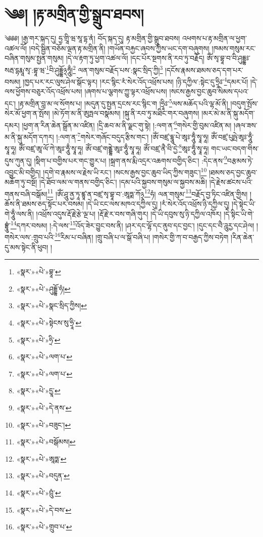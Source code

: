 \chapter{༄༅། །རྟ་མགྲིན་གྱི་སྒྲུབ་ཐབས།}༄༅༅། །རྒྱ་གར་སྐད་དུ། ཧྱ་གྲཱི་ཝ་སཱ་དྷ་ནཾ། བོད་སྐད་དུ། རྟ་མགྲིན་གྱི་སྒྲུབ་ཐབས། འཕགས་པ་རྟ་མགྲིན་ལ་ཕྱག་འཚལ་ལོ། །བདེ་སྦྱིན་བཅོམ་ལྡན་རྟ་མགྲིན་ནི། །གཡོན་བརྐྱང་ཞབས་ཀྱིས་ཡང་དག་བཞུགས། །ཁམས་གསུམ་རང་བཞིན་གསུམ་སྤྱན་གསུམ། །དེ་ལ་རྟག་ཏུ་ཕྱག་འཚལ་ལོ། །དང་པོར་སྔགས་ནི་རབ་ཏུ་བརྗོད། ཨོཾ་སྭ་བྷཱ་བ་བི་ཤུདྡྷཿ་སརྦ་དྷརྨཱ་སྭ་:བྷཱ་ཝ་\footnote{«སྣར་»«པེ་»བྷཱ་}བི་ཤུདྡྷོ྅ཧཱུྃ།\footnote{«སྣར་»«པེ་»ཤུདྡྷོ་ཧཾ།} ལན་གསུམ་བརྗོད་པས་:སྣང་སྲིད་ཀྱི།\footnote{«སྣར་»«པེ་»སྣང་སྲིད་ཀྱིས།} །དངོས་རྣམས་ཐམས་ཅད་དག་པར་བསམ། །ཁྱད་པར་རང་ལུས་ཤེལ་སྒོང་ལྟར། །རང་སྙིང་རཾ་སེར་འོད་འཕྲོས་པས། །ཉི་དཀྱིལ་:སྟེང་དུ་ཧྲཱིཿ་\footnote{«སྣར་»«པེ་»སྟེངས་སུ་ཧྲཱི་}དམར་པོ། །དེ་ལས་ཕྱོགས་བཅུར་འོད་འཕྲོས་པས། །ཞགས་པ་ལྕགས་ཀྱུ་ལྟར་འཕྲོས་པས། །སངས་རྒྱས་བྱང་ཆུབ་སེམས་དཔའ་དང་། །རྟ་མགྲིན་བླ་མ་ལ་སོགས་པ། །མདུན་དུ་སྤྱན་དྲངས་རང་སྙིང་ག །ཧྲཱིཿ་\footnote{«སྣར་»«པེ་»ཧྲི་}ལས་མཆོད་པའི་ལྷ་མོ་ནི། །བདུག་སྤོས་སེར་མོ་ཕྱག་ན་སྤོས། །མེ་ཏོག་མ་ནི་ཨུཏྤལ་བསྣམས། །སྐུ་ནི་རབ་ཏུ་མཐིང་གར་བཞུགས། །མར་མེ་མ་ནི་སྐུ་མདོག་དམར། །ཕྱག་ན་རིན་ཆེན་སྒྲོན་མ་འཛིན། །དྲི་ཆབ་མ་ནི་ལྗང་གུ་སྟེ། །:ལག་ན་\footnote{«སྣར་»«པེ་»ལག་པ་}གསེར་གྱི་བུམ་འཛིན་མ། །ཞལ་ཟས་མ་ནི་སྐུ་མདོག་དཀར། །:ལག་ན་\footnote{«སྣར་»«པེ་»ལག་པ་}གསེར་གཞོང་བདུད་རྩིས་གང་། །ཨོཾ་བཛྲ་དྷཱུ་པེ་ཨཱཿ་ཧཱུྃ་སྭཱ་ཧཱ། ཨོཾ་བཛྲ་པུཥྤེ་ཨཱཿ་ཧཱུྃ་སྭཱ་ཧཱ། ཨོཾ་བཛྲ་ཨཱ་ལོ་ཀེ་ཨཱཿ་ཧཱུྃ་སྭཱ་ཧཱ། ཨོཾ་བཛྲ་གནྡྷེ་ཨཱཿ་ཧཱུྃ་སྭཱ་ཧཱ། ཨོཾ་བཛྲ་ནཻ་བི་དྱེ་\footnote{«སྣར་»«པེ་»དྱཱ་}ཨཱཿ་ཧཱུྃ་སྭཱ་ཧཱ། གང་ཡང་བདག་གིས་དུས་ཀུན་དུ། །སྡིག་པ་བགྱིས་པར་གང་གྱུར་པ། །སྐྲག་ནས་རྨི་འདྲར་འཆགས་བགྱིད་ཅིང་། :དེང་ནས་\footnote{«སྣར་»«པེ་»དེ་ནས་}བརྩམས་ཏེ་འབྱུང་མི་བགྱིད། །དགེ་བ་རྣམས་ལ་རྗེས་ཡི་རང་། །སངས་རྒྱས་བྱང་ཆུབ་ཡིད་ཀྱིས་གཟུང་།\footnote{«སྣར་»«པེ་»བཟུང་།} །ཐམས་ཅད་བྱང་ཆུབ་མཆོག་ཏུ་བསྔོ། །དེ་ཐོབ་ལམ་ལ་གནས་བགྱིད་ཅིང་། །དམ་པའི་སྐྱབས་གསུམ་ལ་སྐྱབས་མཆི། །དེ་རྗེས་ཚངས་པའི་གནས་བཞི་བསྒོམ།\footnote{«སྣར་»«པེ་»བསྒོམས།} །ཨོཾ་ཤཱུ་ནྱ་ཏཱ་ཛྙཱ་ན་བཛྲ་སྭ་བྷཱ་བ་:ཨཱཏྨ་ཀོ྅\footnote{«སྣར་»«པེ་»ཨཱཏྨ་}ཧཾ། ལན་གསུམ་\footnote{«སྣར་»«པེ་»བདུན་}བརྗོད་བྱ་ཏིང་འཛིན་གྱིས། །ཆོས་ནི་ཐམས་ཅད་སྟོང་པར་བསམ། །དེ་ཡི་ངང་ལས་མཁའ་དཀྱིལ་དུ། །རཾ་སེར་འོད་འཕྲོས་ཉི་དཀྱིལ་དུ། །དེ་སྟེང་ཡི་གེ་ཧཱུྃ་ལས་ནི། །འཕྲོས་འདུས་རྡོ་རྗེ་རྩེ་ལྔ་པ། །རྡོ་རྗེ་ར་བས་གཞི་གུར། །དེ་ཡི་དབུས་སུ་ཉི་དཀྱིལ་འཁོར། །དེ་སྟིང་ཡི་གེ་བྷྲཱུཾ་\footnote{«སྣར་»«པེ་»བྲུཾ་}དཀར་བསམ། །:དེ་ལས་\footnote{«སྣར་»«པེ་»དེ་བས་}འོད་ཟེར་བྱུང་བས་ནི། །ཤར་དང་ལྷོ་དང་ནུབ་དང་བྱང་། །དུང་དང་བཻ་ཌཱུརྱ་དང་ཤེལ། །གསེར་ལས་:གྲུབ་པའི་\footnote{«སྣར་»«པེ་»གྲུབ་པ་}རིམ་པ་བཞིན། །གྲུ་བཞི་པ་ལ་སྒོ་བཞི་པ། །གསེར་གྱི་ཀ་བ་བརྒྱད་ཀྱིས་བཏེག །རིན་ཆེན་དུ་མས་སྟེང་ནི་ཕུབ། །
